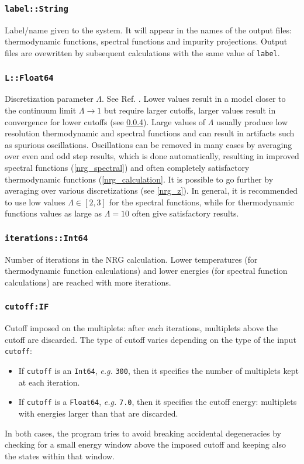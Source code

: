 \documentclass[notitlepage]{article}
\begin{document}
\subsubsection{\texttt{label::String}}
\label{nrg_label}
Label/name given to the system. It will appear in the
names of the output files: thermodynamic functions, spectral
functions and impurity projections. Output files are
ovewritten by subsequent calculations with the same value of
\texttt{label}.

\subsubsection{\texttt{L::Float64}}
\label{nrg_L}
Discretization parameter $\Lambda$. See Ref.
\cite{bulla2008}. Lower values result in a model closer to
the continuum limit $\Lambda\rightarrow 1$ but require
larger cutoffs, larger values result in convergence for
lower cutoffs (see \ref{nrg_cutoff}). Large values of
$\Lambda$ usually produce low resolution thermodynamic and
spectral functions and can result in artifacts such as
spurious oscillations. Oscillations can be removed in many
cases by averaging over even and odd step results, which is
done automatically, resulting in improved spectral functions
(\ref{nrg_spectral}) and often completely satisfactory
thermodynamic functions (\ref{nrg_calculation}. It is
possible to go further by averaging over various
discretizations (see \ref{nrg_z}). In general, it is
recommended to use low values $\Lambda\in[2,3]$ for the
spectral functions, while for thermodynamic functions values
as large as $\Lambda=10$ often give satisfactory results.

\subsubsection{\texttt{iterations::Int64}}
\label{nrg_iterations}
Number of iterations in the NRG calculation. Lower
temperatures (for thermodynamic function calculations) and
lower energies (for spectral function calculations) are
reached with more iterations.

\subsubsection{\texttt{cutoff:IF}}
\label{nrg_cutoff}
Cutoff imposed on the multiplets: after each iterations,
multiplets above the cutoff are discarded. The type of
cutoff varies depending on the type of the input
\texttt{cutoff}:
\begin{itemize}
    \item If \texttt{cutoff} is an \texttt{Int64},
    \textit{e.g.} \texttt{300}, then it
    specifies the number of multiplets kept at each
    iteration.
    \item If \texttt{cutoff} is a \texttt{Float64},
    \textit{e.g.} \texttt{7.0}, then it
    specifies the cutoff energy: multiplets with energies
    larger than that are discarded.
\end{itemize}
In both cases, the program tries to avoid breaking
accidental degeneracies by checking for a small energy
window above the imposed cutoff and keeping also the states
within that window.
\end{document}
